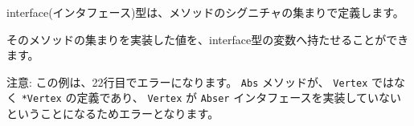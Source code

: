 interface(インタフェース)型は、メソッドのシグニチャの集まりで定義します。

そのメソッドの集まりを実装した値を、interface型の変数へ持たせることができます。

注意: この例は、22行目でエラーになります。 \texttt{Abs} メソッドが、 
\texttt{Vertex} ではなく \texttt{*Vertex} の定義であり、 
\texttt{Vertex} が \texttt{Abser} インタフェースを実装していない
ということになるためエラーとなります。